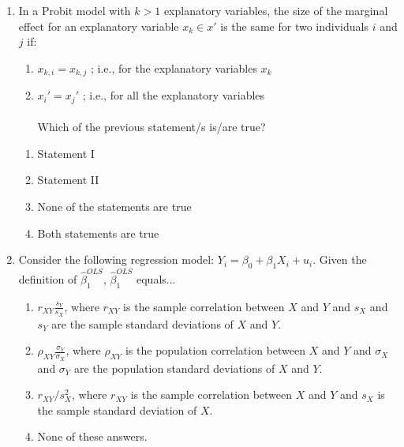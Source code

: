 \documentclass{article}
\begin{document}
\begin{enumerate}
    \item In a Probit model with $k>1$ explanatory variables, the size of the marginal effect  for an explanatory variable $x_k\in x'$ is the same for two individuals $i$ and $j$ if:
\begin{enumerate}
    \item[I.] $x_{k,i}=x_{k,j}$ ; i.e., for the explanatory variables $x_k$
    \item[II.] $x_i'=x_j'$ ; i.e., for all the explanatory variables\\\\
    Which of the previous statement/s is/are true? 
    \end{enumerate}
\begin{enumerate}[label=(\alph*)]
        \item Statement I
        \item Statement II
        \item None of the statements are true
        \item Both statements are true
\end{enumerate}\vspace{.25cm}



    \item Consider the following regression model: $Y_i = \beta_0 + \beta_1 X_i + u_i$. Given the definition of $\hat{\beta}^{OLS}_1$,  $\hat{\beta}^{OLS}_1$ equals...
    \begin{enumerate}[label=\alph*)]
        \item $r_{XY}\frac{s_Y}{s_X}$, where $r_{XY}$ is the sample correlation between $X$ and $Y$ and ${s_X}$ and ${s_Y}$ are the sample standard deviations of $X$ and $Y$. 
        \item $\rho_{XY}\frac{\sigma_Y}{\sigma_X}$, where $\rho_{XY}$ is the population correlation between $X$ and $Y$ and ${\sigma_X}$ and ${\sigma_Y}$ are the population standard deviations of $X$ and $Y$. 
        \item $r_{XY}/{s_X^2}$, where $r_{XY}$ is the sample correlation between $X$ and $Y$ and ${s_X}$ is the sample standard deviation of $X$. 
        \item None of these answers. 
    \end{enumerate}\vspace{.25cm}


\end{enumerate}
\end{document}

